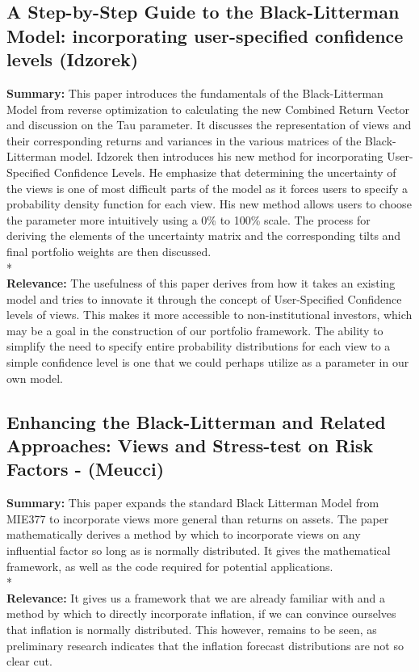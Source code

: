\documentclass[11pt]{article}
\begin{document}
\subsection{\textnormal{A Step-by-Step Guide to the Black-Litterman Model: incorporating user-specified confidence levels (Idzorek)}}

\textbf{Summary: }This paper introduces the fundamentals of the Black-Litterman Model from reverse optimization to calculating the new Combined Return Vector and discussion on the Tau parameter. It discusses the representation of views 
and their corresponding returns and variances in the various matrices of the Black-Litterman model. Idzorek then introduces his new method for incorporating User-Specified Confidence Levels. He emphasize that determining the uncertainty of the views is one of most difficult parts of the model as it forces users to specify a probability density function for each view. His new method allows users to choose the parameter more intuitively using a 0\% to 100\% scale. The process for deriving the elements of the uncertainty matrix and the corresponding tilts and final portfolio weights are then discussed.
\\*
\\
\textbf{Relevance: }The usefulness of this paper derives from how it takes an existing model and tries to innovate it through the concept of User-Specified Confidence levels of views. This makes it more accessible to non-institutional investors, which may be a goal in the construction of our portfolio framework. The ability to simplify the need to specify entire probability distributions for each view to a simple confidence level is one that we could perhaps utilize as a parameter in our own model.
\subsection{\textnormal{Enhancing the Black-Litterman and Related Approaches:
Views and Stress-test on Risk Factors - (Meucci)}}

\textbf{Summary: }This paper expands the standard Black Litterman Model from MIE377 to incorporate views more general than returns on assets. The paper mathematically derives a method by which to incorporate views on any influential factor so long as is normally distributed.  It gives the mathematical framework, as well as the code required for potential applications.
\\*
\\
\textbf{Relevance: }It gives us a framework that we are already familiar with and a method by which to directly incorporate inflation, if we can convince ourselves that inflation is normally distributed. This however, remains to be seen, as preliminary research indicates that the inflation forecast distributions are not so clear cut.


\pagebreak
\end{document}
